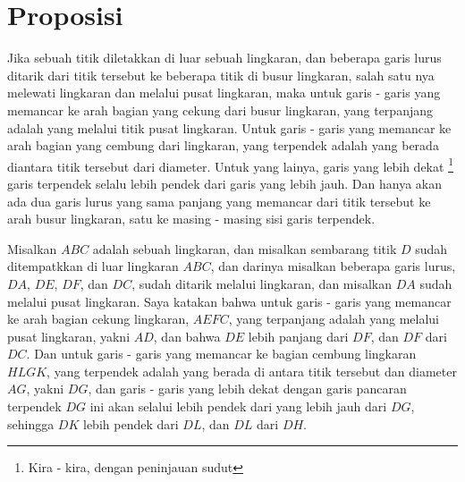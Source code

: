 \documentclass[a4paper]{book}
\begin{document}
\section*{\centering Proposisi \thesection}
Jika sebuah titik diletakkan di luar sebuah lingkaran, dan beberapa garis lurus
ditarik dari titik tersebut ke beberapa titik di busur lingkaran, salah satu
nya melewati lingkaran dan melalui pusat lingkaran, maka untuk garis - garis
yang memancar ke arah bagian yang cekung dari busur lingkaran, yang terpanjang
adalah yang melalui titik pusat lingkaran. Untuk garis - garis yang memancar
ke arah bagian yang cembung dari lingkaran, yang terpendek adalah yang berada
diantara titik tersebut dari diameter.  Untuk yang lainya, garis yang lebih
dekat \footnote{Kira - kira, dengan peninjauan sudut} garis terpendek selalu
lebih pendek dari garis yang lebih jauh. Dan hanya akan ada dua garis lurus 
yang sama panjang yang memancar dari titik tersebut ke arah busur lingkaran,
satu ke masing - masing sisi garis terpendek.

\begin{center}
\end{center}

Misalkan $ABC$ adalah sebuah lingkaran, dan misalkan sembarang titik $D$ sudah
ditempatkkan di luar lingkaran $ABC$, dan darinya misalkan beberapa garis lurus, $DA$, $DE$, $DF$, dan $DC$, sudah ditarik melalui lingkaran, dan misalkan 
$DA$ sudah melalui pusat lingkaran. Saya katakan bahwa untuk garis - garis 
yang memancar ke arah bagian cekung lingkaran, $AEFC$, yang terpanjang adalah
yang melalui pusat lingkaran, yakni $AD$, dan bahwa $DE$ lebih panjang dari
$DF$, dan $DF$ dari $DC$. Dan untuk garis - garis yang memancar ke bagian
cembung lingkaran $HLGK$, yang terpendek adalah yang berada di antara titik 
tersebut dan diameter $AG$, yakni $DG$, dan garis - garis yang lebih dekat 
dengan garis pancaran terpendek $DG$ ini akan selalui lebih pendek dari yang
lebih jauh dari $DG$, sehingga $DK$ lebih pendek dari $DL$, dan $DL$ dari $DH$.
\end{document}
